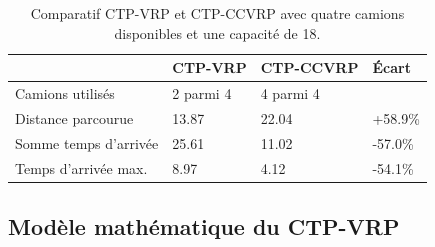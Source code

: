 \documentclass[5p,authoryear,square]{elsarticle}
\begin{document}
\begin{table}[p] \centering \begin{tabular}{@{\small}llll@{}} \toprule %
 & {\footnotesize CTP-VRP} &  {\footnotesize CTP-CCVRP} & Écart \\ \midrule
Camions utilisés & 2 parmi 4 & 4 parmi 4 &  \\
Distance parcourue & 13.87 & 22.04 & +58.9\% \\
Somme temps d'arrivée & 25.61 & 11.02 & -57.0\% \\
Temps d'arrivée max. & 8.97 & 4.12 & -54.1\% \\ \bottomrule
\end{tabular} \caption{Comparatif CTP-VRP et CTP-CCVRP avec quatre camions disponibles et une capacité de 18.} \label{table_quatre_camions}
\end{table}
%

\subsection{Modèle mathématique du CTP-VRP}\label{modele_ctpvrp}
\end{document}
